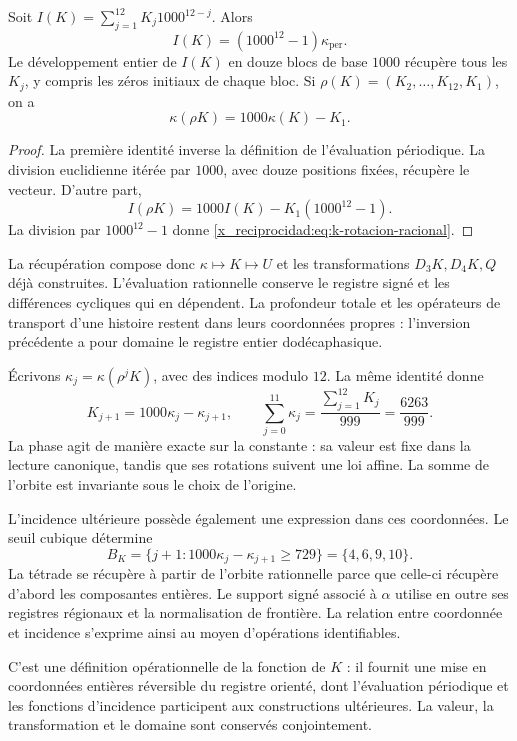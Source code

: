 \begin{proposition}
Soit \(I(K)=\sum_{j=1}^{12}K_j1000^{12-j}\). Alors
\[
 I(K)=(1000^{12}-1)\kappa_{\mathrm{per}}.
\]
Le développement entier de \(I(K)\) en douze blocs de base \(1000\)
récupère tous les \(K_j\), y compris les zéros initiaux de chaque bloc.
Si \(\rho(K)=(K_2,\ldots,K_{12},K_1)\), on a
\begin{equation}
 \kappa(\rho K)=1000\kappa(K)-K_1.
 \label{x_reciprocidad:eq:k-rotacion-racional}
\end{equation}
\end{proposition}
\begin{proof}
La première identité inverse la définition de l'évaluation périodique.
La division euclidienne itérée par \(1000\), avec douze positions fixées,
récupère le vecteur. D'autre part,
\[
 I(\rho K)=1000I(K)-K_1(1000^{12}-1).
\]
La division par \(1000^{12}-1\) donne \eqref{x_reciprocidad:eq:k-rotacion-racional}.
\end{proof}

La récupération compose donc \(\kappa\mapsto K\mapsto U\)
et les transformations \(D_3K,D_4K,Q\) déjà construites. L'évaluation
rationnelle conserve le registre signé et les différences cycliques qui
en dépendent. La profondeur totale et les opérateurs de transport d'une
histoire restent dans leurs coordonnées propres : l'inversion précédente
a pour domaine le registre entier dodécaphasique.

Écrivons \(\kappa_j=\kappa(\rho^jK)\), avec des indices modulo \(12\).
La même identité donne
\[
 K_{j+1}=1000\kappa_j-\kappa_{j+1},\qquad
 \sum_{j=0}^{11}\kappa_j=\frac{\sum_{j=1}^{12}K_j}{999}
 =\frac{6263}{999}.
\]
La phase agit de manière exacte sur la constante : sa valeur est fixe
dans la lecture canonique, tandis que ses rotations suivent une loi affine.
La somme de l'orbite est invariante sous le choix de l'origine.

L'incidence ultérieure possède également une expression dans ces
coordonnées. Le seuil cubique détermine
\[
 B_K=\{j+1:1000\kappa_j-\kappa_{j+1}\ge729\}
 =\{4,6,9,10\}.
\]
La tétrade se récupère à partir de l'orbite rationnelle parce que celle-ci
récupère d'abord les composantes entières. Le support signé associé
à \(\alpha\) utilise en outre ses registres régionaux et la normalisation
de frontière. La relation entre coordonnée et incidence s'exprime ainsi
au moyen d'opérations identifiables.

C'est une définition opérationnelle de la fonction de \(K\) : il fournit
une mise en coordonnées entières réversible du registre orienté, dont
l'évaluation périodique et les fonctions d'incidence participent aux
constructions ultérieures. La valeur, la transformation et le domaine
sont conservés conjointement.

